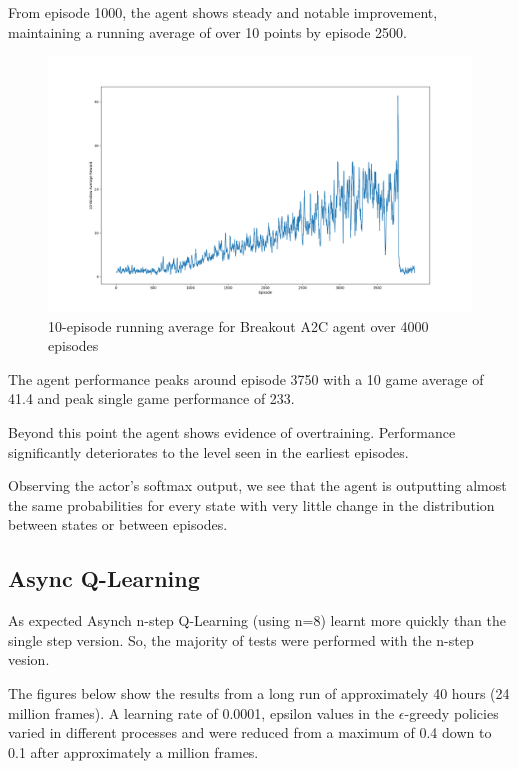 \documentclass{article}
\begin{document}
From episode 1000, the agent shows steady and notable improvement, maintaining a running average of over 10 points by episode 2500.

\begin{figure}
\centering
\captionsetup{width=.8\linewidth}
\vspace*{-1cm}
\includegraphics[width=.98\linewidth]{A2C4000.png}
\caption{10-episode running average for Breakout A2C agent over 4000 episodes}
\end{figure}


 The agent performance peaks around episode 3750 with a 10 game average of 41.4 and peak single game performance of 233.

 Beyond this point the agent shows evidence of overtraining. Performance significantly deteriorates to the level seen in the earliest episodes.

 Observing the actor's softmax output, we see that the agent is outputting almost the same probabilities for every state with very little change in the distribution between states or between episodes.

\subsection{Async Q-Learning}

As expected Asynch n-step Q-Learning (using n=8) learnt more quickly than the single step version. So, the majority of tests were performed with the n-step vesion.

The figures below show the results from a long run of approximately 40 hours (24 million frames). A learning rate of 0.0001, epsilon values in the $\epsilon$-greedy policies varied in different processes and were reduced from a maximum of 0.4 down to 0.1 after approximately a million frames.
\end{document}
